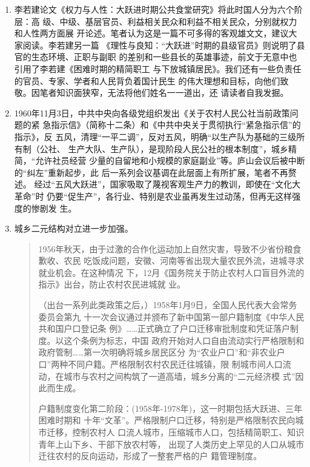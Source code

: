 \begin{enumerate}

\item 李若建论文《权力与人性：大跃进时期公共食堂研究》将此时国人分为六个阶层：高
  级、中级、基层官员、利益相关民众和利益不相关民众，分别就权力和人性两方面展
  开论述。笔者认为这是一篇不可多得的客观雄文文，建议大家阅读。李若建另一篇
  《理性与良知：“大跃进”时期的县级官员》则说明了县官的生态环境、正职与副职
  的差别和一些县长的英雄事迹，前文于无意中也引用了李若建《困难时期的精简职工
  与下放城镇居民》。我们还有一些负责任的官员、专家、学者和人民背负着国计民生
  的伟大理想和目标，向他们致敬。因笔者知识面狭窄，无法将他们姓名一一道出，还
  请读者自我发掘。

\item 1960年11月3日，中共中央向各级党组织发出《关于农村人民公社当前政策问题的紧
  急指示信》（简称十二条）和《中共中央关于贯彻执行“紧急指示信”的指示》，反
  五风，清理“一平二调”，反对五风，明确“以生产队为基础的三级所有制（公社、
  生产大队、生产队），是现阶段人民公社的根本制度”，城乡精简，“允许社员经营
  少量的自留地和小规模的家庭副业”等。庐山会议后被中断的“纠左”重新起步，此
  后一系列会议基调在此层面上有所扩展，笔者不再赘述。%
  经过“五风大跃进”，国家吸取了蔑视客观生产力的教训，即使在“文化大革命”时
  仍要“促生产”，各行业、特别是农业虽再发生过动荡，但再无这样强度的惨剧发
  生。


\item 城乡二元结构对立进一步加强。
  \begin{quotation}
    1956年秋天，由于过激的合作化运动加上自然灾害，导致不少省份粮食歉收、农民
    吃饭成问题，安徽、河南等省出现大量农民外流，进城寻求就业机会。在这种情况
    下，12月《国务院关于防止农村人口盲目外流的指示》出台，防止农村农民进城就
    业。

    （出台一系列此类政策之后，）1958年1月9日，全国人民代表大会常务委员会第九
    十一次会议通过并颁布了新中国第一部户籍制度《中华人民共和国户口登记条
    例》……正式确立了户口迁移审批制度和凭证落户制度。以这个条例为标志，中国
    政府开始对人口自由流动实行严格限制和政府管制……第一次明确将城乡居民区分
    为“农业户口”和“非农业户口”两种不同户籍。严格限制农村农民迁往城镇，限
    制城市间人口流动，在城市与农村之间构筑了一道高墙，城乡分离的“二元经济模
    式”因此而生成。

    户籍制度变化第二阶段：(1958年-1978年)，这一时期包括大跃进、三年困难时期和
    十年“文革”。严格限制户口迁移，特别是严格限制农民向城市迁移，控制农村人
    口流人城市，压缩城市人口，包括精简职工、知识青年上山下乡、干部下放农村等，
    出现了人类历史上罕见的人口从城市迁往农村的反向运动，形成了一整套严格的户
    籍管理制度。\cite{quxiaohuji}
  \end{quotation}


\end{enumerate}
